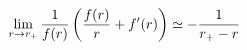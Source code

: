 \begin{equation}
\lim_{r \rightarrow r_+} {1 \over f(r)} \left ( {f(r) \over r} + f'(r) \right ) \simeq
-{1 \over {r_+-r}}
\label{coef1_rp}
\end{equation}

